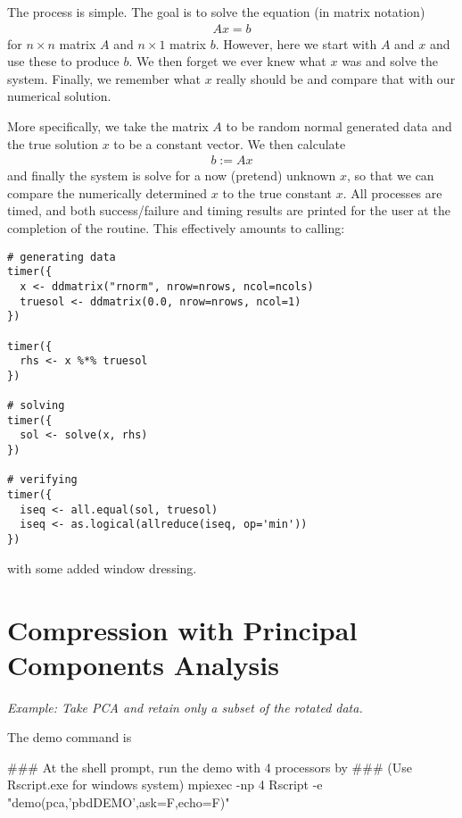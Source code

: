 The process is simple. The goal is to solve the equation (in matrix notation)
\begin{align*}
Ax=b
\end{align*}
for $n\times n$ matrix $A$ and $n\times 1$ matrix $b$. However, here we start
with $A$ and $x$ and use these to produce $b$. We then forget we ever knew
what $x$ was and solve the system. Finally, we remember what $x$ really
should be and compare that with our numerical solution.
  
More specifically, we take the matrix $A$ to be random normal generated data
and the true solution $x$ to be a constant vector. We then calculate
\begin{align*}
b := Ax
\end{align*}
and finally the system is solve for a now (pretend) unknown $x$, so that
we can compare the numerically determined $x$ to the true constant $x$.
All processes are timed, and both success/failure and timing results are
printed for the user at the completion of the routine. This effectively
amounts to calling:
\begin{lstlisting}[language=rr,title=Verifying Distributed System Solving]
# generating data
timer({
  x <- ddmatrix("rnorm", nrow=nrows, ncol=ncols)
  truesol <- ddmatrix(0.0, nrow=nrows, ncol=1)
})

timer({
  rhs <- x %*% truesol
})

# solving
timer({
  sol <- solve(x, rhs)
})

# verifying
timer({
  iseq <- all.equal(sol, truesol)
  iseq <- as.logical(allreduce(iseq, op='min'))
})
\end{lstlisting}
with some added window dressing.







\section{Compression with Principal Components Analysis}
\label{sec:Compression_with_Principal_Components_Analysis}

\emph{Example:  Take PCA and retain only a subset of the rotated data.}

The demo command is
\begin{Command}
### At the shell prompt, run the demo with 4 processors by
### (Use Rscript.exe for windows system)
mpiexec -np 4 Rscript -e "demo(pca,'pbdDEMO',ask=F,echo=F)"
\end{Command}

